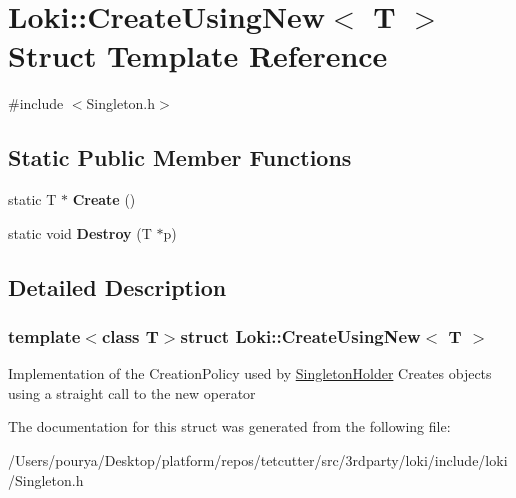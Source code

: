 \hypertarget{structLoki_1_1CreateUsingNew}{}\section{Loki\+:\+:Create\+Using\+New$<$ T $>$ Struct Template Reference}
\label{structLoki_1_1CreateUsingNew}


{\ttfamily \#include $<$Singleton.\+h$>$}

\subsection*{Static Public Member Functions}
\begin{DoxyCompactItemize}
\item 
\hypertarget{structLoki_1_1CreateUsingNew_a31964d318aadd16f17c48743fcd50cdf}{}static T $\ast$ {\bfseries Create} ()\label{structLoki_1_1CreateUsingNew_a31964d318aadd16f17c48743fcd50cdf}

\item 
\hypertarget{structLoki_1_1CreateUsingNew_a4188b322ea06b90120d9ebc81e88216f}{}static void {\bfseries Destroy} (T $\ast$p)\label{structLoki_1_1CreateUsingNew_a4188b322ea06b90120d9ebc81e88216f}

\end{DoxyCompactItemize}


\subsection{Detailed Description}
\subsubsection*{template$<$class T$>$struct Loki\+::\+Create\+Using\+New$<$ T $>$}

Implementation of the Creation\+Policy used by \hyperlink{classLoki_1_1SingletonHolder}{Singleton\+Holder} Creates objects using a straight call to the new operator 

The documentation for this struct was generated from the following file\+:\begin{DoxyCompactItemize}
\item 
/\+Users/pourya/\+Desktop/platform/repos/tetcutter/src/3rdparty/loki/include/loki/Singleton.\+h\end{DoxyCompactItemize}
